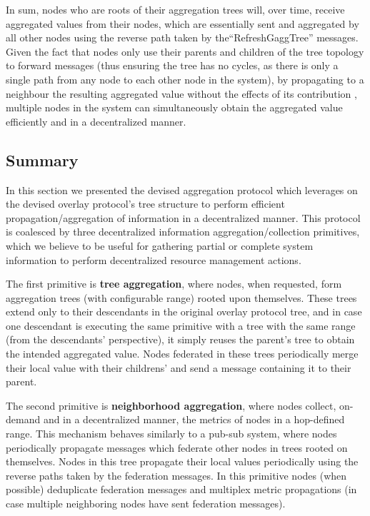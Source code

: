 In sum, nodes who are roots of their aggregation trees will, over time, receive aggregated values from their nodes, which are essentially sent and aggregated by all other nodes using the reverse path taken by the``RefreshGaggTree'' messages. Given the fact that nodes only use their parents and children of the tree topology to forward messages (thus ensuring the tree has no cycles, as there is only a single path from any node to each other node in the system), by propagating to a neighbour the resulting aggregated value without the effects of its contribution , multiple nodes in the system can simultaneously obtain the aggregated value efficiently and in a decentralized manner.

\subsection{Summary}

In this section we presented the devised aggregation protocol which leverages on the devised overlay protocol's tree structure to perform efficient propagation/aggregation of information in a decentralized manner. This protocol is coalesced by three decentralized information aggregation/collection primitives, which we believe to be useful for gathering partial or complete system information to perform decentralized resource management actions. 

The first primitive is \textbf{tree aggregation}, where nodes, when requested, form aggregation trees (with configurable range) rooted upon themselves. These trees extend only to their descendants in the original overlay protocol tree, and in case one descendant is executing the same primitive with a tree with the same range (from the descendants' perspective), it simply reuses the parent's tree to obtain the intended aggregated value. Nodes federated in these trees periodically merge their local value with their childrens' and send a message containing it to their parent.

The second primitive is \textbf{neighborhood aggregation}, where nodes collect, on-demand and in a decentralized manner, the metrics of nodes in a hop-defined range. This mechanism behaves similarly to a pub-sub system, where nodes periodically propagate messages which federate other nodes in trees rooted on themselves. Nodes in this tree propagate their local values periodically using the reverse paths taken by the federation messages. In this primitive nodes (when possible) deduplicate federation messages and multiplex metric propagations (in case multiple neighboring nodes have sent federation messages).

